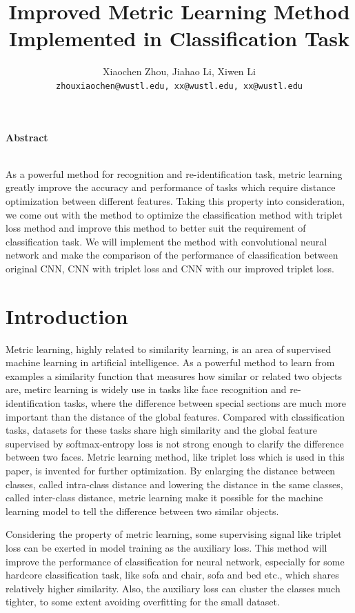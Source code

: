 \documentclass[11pt,onecolumn,letterpaper]{article}
\date{}
\title{Improved Metric Learning Method Implemented in Classification Task}
\author{%
Xiaochen Zhou, Jiahao Li, Xiwen Li\\
{\tt zhouxiaochen@wustl.edu, xx@wustl.edu, xx@wustl.edu}
}
\begin{document}
\maketitle

\begin{center}\textbf{Abstract}\\~\\\parbox{0.85\textwidth}{\em

As a powerful method for recognition and re-identification task, metric learning greatly improve the accuracy and performance of tasks which require distance optimization between different features. Taking this property into consideration, we come out with the method to optimize the classification method with triplet loss method and improve this method to better suit the requirement of classification task. We will implement the method with convolutional neural network and make the comparison of the performance of classification between original CNN, CNN with triplet loss and CNN with our improved triplet loss.
}\end{center}

\section{Introduction}

Metric learning, highly related to similarity learning, is an area of supervised machine learning in artificial intelligence. As a powerful method to learn from examples a similarity function that measures how similar or related two objects are, metirc learning is widely use in tasks like face recognition and re-identification tasks, where the difference between special sections are much more important than the distance of the global features. Compared with classification tasks, datasets for these tasks share high similarity and the global feature supervised by softmax-entropy loss is not strong enough to clarify the difference between two faces. Metric learning method, like triplet loss which is used in this paper, is invented for further optimization. By enlarging the distance between classes, called intra-class distance and lowering the distance in the same classes, called inter-class distance, metric learning make it possible for the machine learning model to tell the difference between two similar objects.

Considering the property of metric learning, some supervising signal like triplet loss can be exerted in model training as the auxiliary loss. This method will improve the performance of classification for neural network, especially for some hardcore classification task, like sofa and chair, sofa and bed etc., which shares relatively higher similarity. Also, the auxiliary loss can cluster the classes much tighter, to some extent avoiding overfitting for the small dataset.
\end{document}
